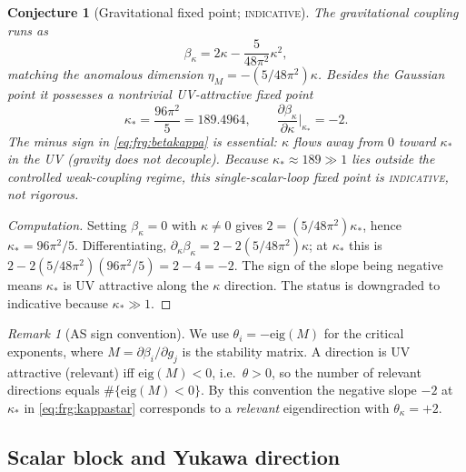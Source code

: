 \documentclass[11pt]{article}
\theoremstyle{plain}
\newtheorem{conjecture}[theorem]{Conjecture}
\theoremstyle{definition}
\theoremstyle{remark}
\newtheorem{remark}[theorem]{Remark}
\begin{document}
\begin{conjecture}[Gravitational fixed point; \textsc{indicative}]
\label{conj:frg:gravity}
The gravitational coupling runs as
\begin{equation}\label{eq:frg:betakappa}
  \beta_{\kappa}=2\kappa-\frac{5}{48\pi^{2}}\kappa^{2},
\end{equation}
matching the anomalous dimension $\eta_{M}=-(5/48\pi^{2})\kappa$. Besides
the Gaussian point it possesses a nontrivial UV-attractive fixed point
\begin{equation}\label{eq:frg:kappastar}
  \kappa_{\ast}=\frac{96\pi^{2}}{5}=189.4964,
  \qquad
  \frac{\partial\beta_{\kappa}}{\partial\kappa}\bigg|_{\kappa_{\ast}}=-2 .
\end{equation}
The \emph{minus} sign in \eqref{eq:frg:betakappa} is essential: $\kappa$
flows \emph{away} from $0$ toward $\kappa_{\ast}$ in the UV (gravity does
\emph{not} decouple). Because $\kappa_{\ast}\approx189\gg1$ lies outside
the controlled weak-coupling regime, this single-scalar-loop fixed point is
\textsc{indicative}, not rigorous.
\end{conjecture}

\begin{proof}[Computation]
Setting $\beta_{\kappa}=0$ with $\kappa\neq0$ gives
$2=(5/48\pi^{2})\kappa_{\ast}$, hence $\kappa_{\ast}=96\pi^{2}/5$.
Differentiating, $\partial_{\kappa}\beta_{\kappa}=2-2(5/48\pi^{2})\kappa$;
at $\kappa_{\ast}$ this is $2-2(5/48\pi^{2})(96\pi^{2}/5)=2-4=-2$. The
sign of the slope being negative means $\kappa_{\ast}$ is UV attractive
along the $\kappa$ direction. The status is downgraded to indicative
because $\kappa_{\ast}\gg1$. \qedhere
\end{proof}

\begin{remark}[AS sign convention]
\label{rem:frg:convention}
We use $\theta_{i}=-\mathrm{eig}(M)$ for the critical exponents, where
$M=\partial\beta_{i}/\partial g_{j}$ is the stability matrix. A direction
is UV attractive (relevant) iff $\mathrm{eig}(M)<0$, i.e.\ $\theta>0$, so
the number of relevant directions equals $\#\{\mathrm{eig}(M)<0\}$. By this
convention the negative slope $-2$ at $\kappa_{\ast}$ in
\eqref{eq:frg:kappastar} corresponds to a \emph{relevant} eigendirection
with $\theta_{\kappa}=+2$.
\end{remark}

\subsection{Scalar block and Yukawa direction}
\label{sec:frg:scalar}
\end{document}
